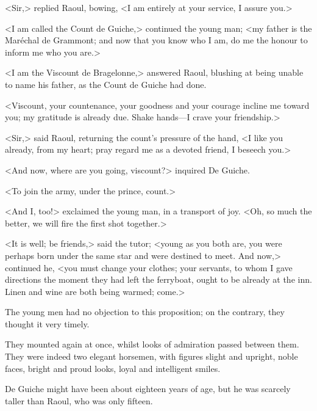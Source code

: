<Sir,> replied Raoul, bowing, <I am entirely at your service, I assure you.>

<I am called the Count de Guiche,> continued the young man; <my father is the Maréchal de Grammont; and now that you know who I am, do me the honour to inform me who you are.>

<I am the Viscount de Bragelonne,> answered Raoul, blushing at being unable to name his father, as the Count de Guiche had done.

<Viscount, your countenance, your goodness and your courage incline me toward you; my gratitude is already due. Shake hands—I crave your friendship.>

<Sir,> said Raoul, returning the count's pressure of the hand, <I like you already, from my heart; pray regard me as a devoted friend, I beseech you.>

<And now, where are you going, viscount?> inquired De Guiche.

<To join the army, under the prince, count.>

<And I, too!> exclaimed the young man, in a transport of joy. <Oh, so much the better, we will fire the first shot together.>

<It is well; be friends,> said the tutor; <young as you both are, you were perhaps born under the same star and were destined to meet. And now,> continued he, <you must change your clothes; your servants, to whom I gave directions the moment they had left the ferryboat, ought to be already at the inn. Linen and wine are both being warmed; come.>

The young men had no objection to this proposition; on the contrary, they thought it very timely.

They mounted again at once, whilst looks of admiration passed between them. They were indeed two elegant horsemen, with figures slight and upright, noble faces, bright and proud looks, loyal and intelligent smiles.

De Guiche might have been about eighteen years of age, but he was scarcely taller than Raoul, who was only fifteen. 
